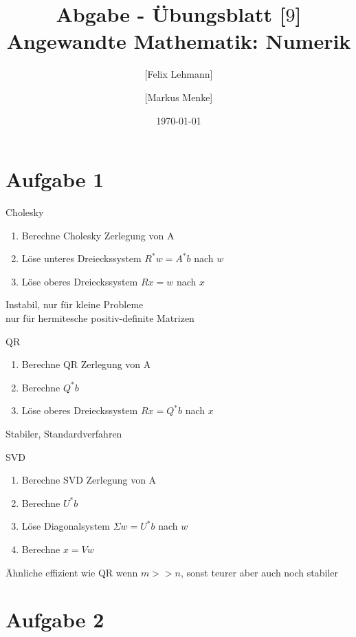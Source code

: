 \documentclass[10pt,a4paper]{article}
\begin{document}
\title{Abgabe - Übungsblatt [$9$]\\
\small{Angewandte Mathematik: Numerik}}
\author{ [Felix Lehmann] \and [Markus Menke]}
\date{\today}
\maketitle

\section*{Aufgabe 1}

Cholesky
\begin{enumerate}
    \item Berechne Cholesky Zerlegung von A
    \item Löse unteres Dreieckssystem $R^*w = A^*b$ nach $w$
    \item Löse oberes Dreieckssystem $Rx = w$ nach $x$
\end{enumerate}
Instabil, nur für kleine Probleme\\
nur für hermitesche positiv-definite Matrizen

QR
\begin{enumerate}
    \item Berechne QR Zerlegung von A
    \item Berechne $Q^* b$
    \item Löse oberes Dreieckssystem $R x = Q^* b$ nach $x$
\end{enumerate}
Stabiler, Standardverfahren

SVD
\begin{enumerate}
    \item Berechne SVD Zerlegung von A
    \item Berechne $U^* b$
    \item Löse Diagonalsystem $\Sigma w = U^* b$ nach $w$
    \item Berechne $x = V w$
\end{enumerate}
Ähnliche effizient wie QR wenn $m>>n$, sonst teurer aber auch noch stabiler

\section*{Aufgabe 2}
\end{document}
